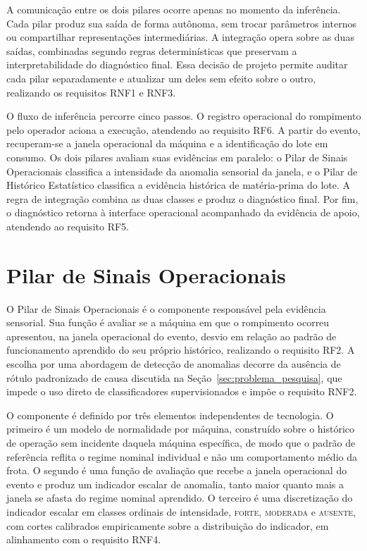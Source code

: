 A comunicação entre os dois pilares ocorre apenas no momento da inferência. Cada pilar produz sua saída de forma autônoma, sem trocar parâmetros internos ou compartilhar representações intermediárias. A integração opera sobre as duas saídas, combinadas segundo regras determinísticas que preservam a interpretabilidade do diagnóstico final. Essa decisão de projeto permite auditar cada pilar separadamente e atualizar um deles sem efeito sobre o outro, realizando os requisitos RNF1 e RNF3.

O fluxo de inferência percorre cinco passos. O registro operacional do rompimento pelo operador aciona a execução, atendendo ao requisito RF6. A partir do evento, recuperam-se a janela operacional da máquina e a identificação do lote em consumo. Os dois pilares avaliam suas evidências em paralelo: o Pilar de Sinais Operacionais classifica a intensidade da anomalia sensorial da janela, e o Pilar de Histórico Estatístico classifica a evidência histórica de matéria-prima do lote. A regra de integração combina as duas classes e produz o diagnóstico final. Por fim, o diagnóstico retorna à interface operacional acompanhado da evidência de apoio, atendendo ao requisito RF5.


\section{Pilar de Sinais Operacionais}
\label{sec:impl_sinais}

O Pilar de Sinais Operacionais é o componente responsável pela evidência sensorial. Sua função é avaliar se a máquina em que o rompimento ocorreu apresentou, na janela operacional do evento, desvio em relação ao padrão de funcionamento aprendido do seu próprio histórico, realizando o requisito RF2. A escolha por uma abordagem de detecção de anomalias decorre da ausência de rótulo padronizado de causa discutida na Seção~\ref{sec:problema_pesquisa}, que impede o uso direto de classificadores supervisionados e impõe o requisito RNF2.

O componente é definido por três elementos independentes de tecnologia. O primeiro é um modelo de normalidade por máquina, construído sobre o histórico de operação sem incidente daquela máquina específica, de modo que o padrão de referência reflita o regime nominal individual e não um comportamento médio da frota. O segundo é uma função de avaliação que recebe a janela operacional do evento e produz um indicador escalar de anomalia, tanto maior quanto mais a janela se afasta do regime nominal aprendido. O terceiro é uma discretização do indicador escalar em classes ordinais de intensidade, \textsc{forte}, \textsc{moderada} e \textsc{ausente}, com cortes calibrados empiricamente sobre a distribuição do indicador, em alinhamento com o requisito RNF4.

